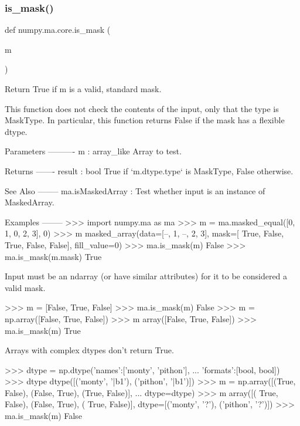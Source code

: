 \subsubsection{\texorpdfstring{is\+\_\+mask()}{is\_mask()}}
{\footnotesize\ttfamily def numpy.\+ma.\+core.\+is\+\_\+mask (\begin{DoxyParamCaption}\item[{}]{m }\end{DoxyParamCaption})}

\begin{DoxyVerb}Return True if m is a valid, standard mask.

This function does not check the contents of the input, only that the
type is MaskType. In particular, this function returns False if the
mask has a flexible dtype.

Parameters
----------
m : array_like
    Array to test.

Returns
-------
result : bool
    True if `m.dtype.type` is MaskType, False otherwise.

See Also
--------
ma.isMaskedArray : Test whether input is an instance of MaskedArray.

Examples
--------
>>> import numpy.ma as ma
>>> m = ma.masked_equal([0, 1, 0, 2, 3], 0)
>>> m
masked_array(data=[--, 1, --, 2, 3],
             mask=[ True, False,  True, False, False],
       fill_value=0)
>>> ma.is_mask(m)
False
>>> ma.is_mask(m.mask)
True

Input must be an ndarray (or have similar attributes)
for it to be considered a valid mask.

>>> m = [False, True, False]
>>> ma.is_mask(m)
False
>>> m = np.array([False, True, False])
>>> m
array([False,  True, False])
>>> ma.is_mask(m)
True

Arrays with complex dtypes don't return True.

>>> dtype = np.dtype({'names':['monty', 'pithon'],
...                   'formats':[bool, bool]})
>>> dtype
dtype([('monty', '|b1'), ('pithon', '|b1')])
>>> m = np.array([(True, False), (False, True), (True, False)],
...              dtype=dtype)
>>> m
array([( True, False), (False,  True), ( True, False)],
      dtype=[('monty', '?'), ('pithon', '?')])
>>> ma.is_mask(m)
False\end{DoxyVerb}
 \mbox{\label{namespacenumpy_1_1ma_1_1core_ae82b142fe1b3cef4273efa3ac4729cdb}} 
